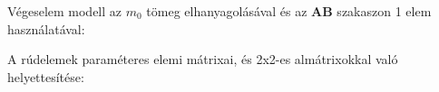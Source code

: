 \documentclass{article}
\begin{document}
	Végeselem modell az $m_{0}$ tömeg elhanyagolásával és az \textbf{AB} szakaszon 1 elem használatával:
	\begin{figure}[h!]		
		\begin{center}	
		\end{center}	
	\caption{}
	\end{figure}
	
	\begin{flushleft}
		A rúdelemek paraméteres elemi mátrixai, és 2x2-es almátrixokkal való helyettesítése:
	\end{flushleft}
	
\end{document}
